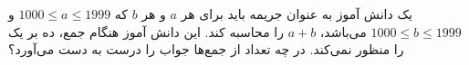 \p
    یک دانش آموز به عنوان جریمه باید برای هر 
	$a$ و هر 
	$b$
	که
	$1000 \leq a \leq 1999$
	و
	$1000 \leq b \leq 1999$
	می‌باشد،
	$a + b$ 
	را محاسبه کند. این دانش آموز هنگام جمع، ده بر یک را منظور نمی‌کند. در چه تعداد از جمع‌ها جواب را درست به دست می‌آورد؟